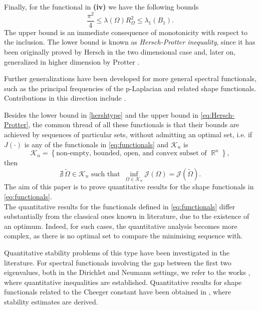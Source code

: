 \documentclass[oneside,a4paper,11pt,notitlepage]{article}
\theoremstyle{definition}
\theoremstyle{plain}
\theoremstyle{definition}
\DeclareMathOperator{\R}{\mathbb{R}}
\begin{document}
Finally, for the functional in \textbf{(iv)} we have the following bounds
\begin{equation}\label{eq:Hersch-Protter}
    \frac{\pi^2}{4}\le\lambda( \Omega)R^2_\Omega\le \lambda_1(B_1).
\end{equation}
The upper bound is an immediate consequence of monotonicity with respect to the inclusion. The lower bound is known as \textit{Hersch-Protter inequality}, since it has been originally proved by Hersch \cite{hersch1960frequence} in the two dimensional case and, later on, generalized in higher dimension by Protter \cite{protter1981lower}.


Further generalizations have been developed for more general spectral functionals, such as the principal frequencies of the p-Laplacian and related shape functionals. Contributions in this direction include \cite{brasco2018principal, brasco_2020_principal_frequencies}.

Besides the lower bound in \eqref{hershtype} and the upper bound in \eqref{eq:Hersch-Protter}, the common thread of all these functionals is that their bounds are achieved by sequences of particular sets, without admitting an optimal set, i.e. if $J(\cdot)$ is any of the functionals in \eqref{eq:functionals} and $\mathcal{K}_n$ is
$$\mathcal{K}_n= \left\{\text{non-empty, bounded, open, and convex subset of }\R^n\right\},$$ then
$$
\nexists \,\tilde \Omega\in\mathcal{K}_n \text{ such that } \, \inf_{\Omega \in \mathcal{K}_n} \mathcal{J}(\Omega) = \mathcal{J}(\tilde \Omega).
$$ 
The aim of this paper is to prove quantitative results for the shape functionals in \eqref{eq:functionals}.\\


The quantitative results for the functionals defined in \eqref{eq:functionals} differ substantially  from the classical ones known in literature, due to the existence of an optimum. Indeed, for such cases, the quantitative analysis becomes more complex, as there is no optimal set to compare the minimising sequence with. 

Quantitative stability problems of this type have been investigated in the literature.
For spectral functionals involving the gap between the first two eigenvalues, both in the Dirichlet and Neumann settings, we refer to the works \cite{ABF,ABF2}, where quantitative inequalities are established. 
Quantitative results for shape functionals related to the Cheeger constant have been obtained in \cite{FT2021,FMP}, where stability estimates are derived.
\end{document}
